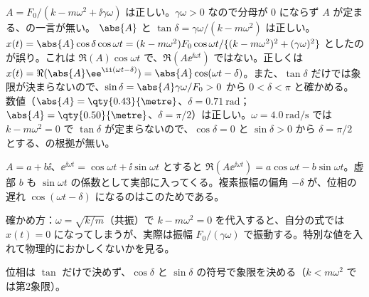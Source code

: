 \begin{kotaeran}
   $A=F_{0}/(k-m\omega^{2}+\ii\gamma\omega)$ は正しい。$\gamma\omega>0$ なので分母が $0$ にならず $A$ が定まる、の一言が無い。
   $\abs{A}$ と $\tan\delta=\gamma\omega/(k-m\omega^{2})$ は正しい。$x(t)=\abs{A}\cos\delta\cos\omega t=(k-m\omega^{2})F_{0}\cos\omega t/\{(k-m\omega^{2})^{2}+(\gamma\omega)^{2}\}$ としたのが誤り。これは $\Re(A)\cos\omega t$ で、$\Re(A\ee^{\ii\omega t})$ ではない。正しくは $x(t)=\Re(\abs{A}\ee^{\ii(\omega t-\delta)})=\abs{A}\cos(\omega t-\delta)$。また、$\tan\delta$ だけでは象限が決まらないので、$\sin\delta=\abs{A}\gamma\omega/F_{0}>0$ から $0<\delta<\pi$ と確かめる。
   数値（$\abs{A}=\qty{0.43}{\metre}$、$\delta=\qty{0.71}{\radian}$；$\abs{A}=\qty{0.50}{\metre}$、$\delta=\pi/2$）は正しい。$\omega=\qty{4.0}{\radian\per\second}$ では $k-m\omega^{2}=0$ で $\tan\delta$ が定まらないので、$\cos\delta=0$ と $\sin\delta>0$ から $\delta=\pi/2$ とする、の根拠が無い。
\end{kotaeran}
\begin{rikai}
  \item $A=a+b\ii$、$\ee^{\ii\omega t}=\cos\omega t+\ii\sin\omega t$ とすると $\Re(A\ee^{\ii\omega t})=a\cos\omega t-b\sin\omega t$。虚部 $b$ も $\sin\omega t$ の係数として実部に入ってくる。複素振幅の偏角 $-\delta$ が、位相の遅れ $\cos(\omega t-\delta)$ になるのはこのためである。
  \item 確かめ方：$\omega=\sqrt{k/m}$（共振）で $k-m\omega^{2}=0$ を代入すると、自分の式では $x(t)=0$ になってしまうが、実際は振幅 $F_{0}/(\gamma\omega)$ で振動する。特別な値を入れて物理的におかしくないかを見る。
  \item 位相は $\tan$ だけで決めず、$\cos\delta$ と $\sin\delta$ の符号で象限を決める（$k<m\omega^{2}$ では第2象限）。
\end{rikai}
